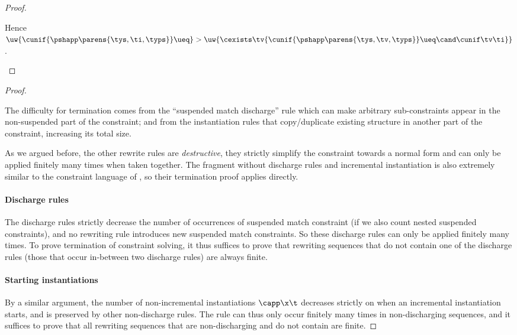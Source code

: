 \documentclass[acmsmall,screen,nonacm%
\Anonymous{,anonymous}{}%
\Final{}{,review}%
]{acmart}
\newcommand{\BBemlti}{Pottier-Remy/emlti} %
\providecommand{\DIFaddbegin}{} %
\providecommand{\DIFaddend}{} %
\providecommand{\DIFdelbegin}{} %
\providecommand{\DIFdelend}{} %
\begin{document}
\begin{lemma}
\begin{proof}
\begin{proofcases}
	Hence $\uw {\cunif {\pshapp \parens{\tys, \ti, \typs}} \ueq } > \uw {\cexists \tv {\cunif {\pshapp \parens{\tys, \tv, \typs}} \ueq \cand \cunif \tv \ti}}$.
    \end{proofcases}
  \end{proof}
\end{lemma}

\terminationBIS*
\begin{proof}
\begin{local}\sloppy
  The difficulty for termination comes from the ``suspended match discharge'' rule
   which can make arbitrary
  sub-constraints appear in the non-suspended part of the constraint;
  and from the instantiation rules that copy/duplicate existing
  structure in another part of the constraint, increasing its total
  size.

\end{local}
  As we argued before, the other rewrite rules are \emph{destructive},
  they strictly simplify the constraint towards a normal form and can
  only be applied finitely many times when taken together. The
  fragment without discharge rules and incremental instantiation is
  also extremely similar to the constraint language of
  \DIFdelbegin %
\DIFdelend \DIFaddbegin \citet*{\BBemlti}\DIFaddend , so their termination proof applies
  directly.

  \paragraph{Discharge rules} The discharge rules strictly decrease
  the number of occurrences of suspended match constraint (if we also
  count nested suspended constraints), and no rewriting rule
  introduces new suspended match constraints. So these discharge rules
  can only be applied finitely many times. To prove termination of
  constraint solving, it thus suffices to prove that rewriting
  sequences that do not contain one of the discharge rules (those that
  occur in-between two discharge rules) are always finite.

  \paragraph{Starting instantiations} By a similar argument, the number
  of non-incremental instantiations $\capp \x \t$ decreases strictly on
   when an incremental instantiation starts, and is
  preserved by other non-discharge rules. The rule 
  can thus only occur finitely many times in non-discharging sequences,
  and it suffices to prove that all rewriting sequences that are
  non-discharging and do not contain  are finite.


\end{proof}
\end{document}
